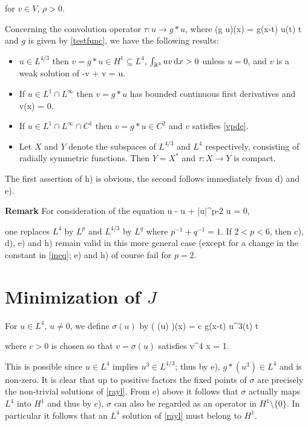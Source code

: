 for $v \in V$, $\rho > 0$.

    Concerning the convolution operator $\tau : u \to g \ast u$, where 
    \be (g \ast u)(x) = \intrrr g(x-t) u(t) \diff t \ee
    and $g$ is given by \eqref{testfunc}, we have the following results:

\begin{itemize}
\item $u \in L^{4/3}$ then $v = g \ast u \in H^1 \subseteq L^4$, $\int_{\mathbb{R}^3} u v
\mathop{}\!\mathrm{d} x > 0$ unless $u = 0$, and $v$ is a weak solution of
\be\label{vpde} -\Delta v + v = u. \ee
\item If $u \in L^1 \cap L^\infty$ then $v = g \ast u$ has bounded continuous
first derivatives and
\be {} v(x) = 0. \ee
\item If $u \in L^1 \cap L^\infty \cap C^1$ then $v = g \ast u \in C^2$ and $v$
satisfies \eqref{vpde}.
\item Let $X$ and $Y$ denote the subspaces of $L^{4/3}$ and $L^4$ respectively,
consisting of radially symmetric functions. Then $Y = X^*$ and $\tau : X \to Y$
is compact.
\end{itemize}

The first assertion of h) is obvious, the second follows immediately from d) and
e).

\textbf{Remark} For consideration of the equation
\be\label{upde2} \Delta u - u + |u|^{p-2} u = 0,\ee

one replaces $L^4$ by $L^p$ and $L^{4/3}$ by $L^q$ where $p^{-1} + q^{-1} = 1$.
If $2 < p < 6$, then c), d), e) and h) remain valid in this more general case
(except for a change in the constant in \eqref{ineq}; e) and h) of course fail
for $p=2$.

\section{Minimization of $J$}
For $u \in L^4$, $u\neq 0$, we define $\sigma(u)$ by
\be\label{sigmadef} \left( \sigma(u) \right)(x) = c \intrrr g(x-t) u^3(t) \diff
t \ee

where $c > 0$ is chosen so that $v = \sigma(u)$ satisfies
\be\label{sigmaint} \intrrr v^4 \diff x = 1.\ee

This is possible since $u \in L^4$ implies $u^3 \in L^{4/3}$; thus by e), $g
\ast (u^3) \in L^4$ and is non-zero. It is clear that up to positive factors the
fixed points of $\sigma$ are precisely the non-trivial solutions of
\eqref{rayl}. From e) above it follows that $\sigma$ actually maps $L^4$ into
$H^1$ and thus by c), $\sigma$ can also be regarded as an operator in
$H^1\setminus\{0\}$. In particular it follows that an $L^4$ solution of \eqref{rayl}
must belong to $H^1$.

